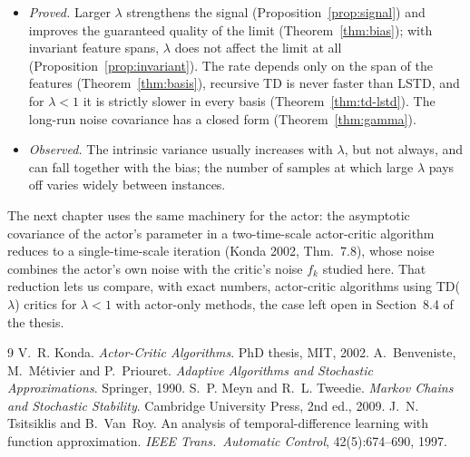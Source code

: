 \documentclass[11pt]{article}
\theoremstyle{definition}
\theoremstyle{remark}
\begin{document}
\begin{itemize}
\item \emph{Proved.} Larger $\lambda$ strengthens the signal
  (Proposition~\ref{prop:signal}) and improves the guaranteed quality of the limit
  (Theorem~\ref{thm:bias}); with invariant feature spans, $\lambda$ does not affect the
  limit at all (Proposition~\ref{prop:invariant}). The rate depends only on the span of the
  features (Theorem~\ref{thm:basis}), recursive TD is never faster than LSTD, and for
  $\lambda < 1$ it is strictly slower in every basis (Theorem~\ref{thm:td-lstd}). The
  long-run noise covariance has a closed form (Theorem~\ref{thm:gamma}).
\item \emph{Observed.} The intrinsic variance usually increases with $\lambda$, but not
  always, and can fall together with the bias; the number of samples at which large
  $\lambda$ pays off varies widely between instances.
\end{itemize}

The next chapter uses the same machinery for the actor: the asymptotic covariance of
the actor's parameter in a two-time-scale actor-critic algorithm reduces to a
single-time-scale iteration (Konda 2002, Thm.~7.8), whose noise combines the actor's
own noise with the critic's noise $f_k$ studied here. That reduction lets us compare,
with exact numbers, actor-critic algorithms using TD($\lambda$) critics for
$\lambda < 1$ with actor-only methods, the case left open in Section~8.4 of the thesis.

\begin{thebibliography}{9}
V.~R. Konda. \emph{Actor-Critic Algorithms}. PhD thesis, MIT, 2002.
A.~Benveniste, M.~M\'etivier and P.~Priouret. \emph{Adaptive Algorithms and
  Stochastic Approximations}. Springer, 1990.
S.~P. Meyn and R.~L. Tweedie. \emph{Markov Chains and Stochastic Stability}.
  Cambridge University Press, 2nd ed., 2009.
J.~N. Tsitsiklis and B.~Van~Roy. An analysis of temporal-difference learning with
  function approximation. \emph{IEEE Trans.\ Automatic Control}, 42(5):674--690, 1997.
\end{thebibliography}
\end{document}
